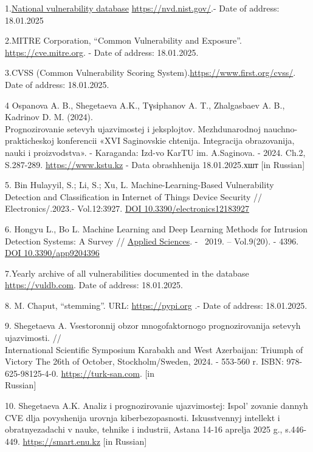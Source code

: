\begin{references}
1.\href{https://nvd.nist.gov/}{National
vulnerability database} \url{https://nvd.nist.gov/}.- Date of address:
18.01.2025

2.MITRE Corporation, ``Common Vulnerability and
Exposure''. \url{https://cve.mitre.org}. - Date of address:
18.01.2025. 

3.CVSS (Common Vulnerability Scoring
System).\url{https://www.first.org/cvss/}. Date of address:
18.01.2025. 

4 Ospanova A. B., Shegetaeva A.K., Tүsіphanov A. T., Zhalgasbaev A. B.,
Kadrinov D. M. (2024). \\Prognozirovanie setevyh ujazvimostej i
jeksplojtov. Mezhdunarodnoj nauchno-prakticheskoj konferencii «XVI
Saginovskie chtenija. Integracija obrazovanija, nauki i proizvodstva». -
Karaganda: Izd-vo KarTU im. A.Saginova. - 2024. Ch.2, S.287-289.
\href{https://www.kstu.kz/wp-content/uploads/2024/07/2-chast.pdf}{https://www.kstu.kz}
- Data obrashhenija 18.01.2025.хшт {[}in Russian{]}

5. Bin Hulayyil, S.; Li, S.; Xu, L. Machine-Learning-Based Vulnerability
Detection and Classification in Internet of Things Device Security //
Electronics/.2023.- Vol.12:3927.
\href{https://doi.org/10.3390/electronics12183927}{DOI
10.3390/electronics12183927}

6. Hongyu L., Bo L. Machine Learning and Deep Learning Methods for
Intrusion Detection Systems: A Survey //
\href{https://www.mdpi.com/journal/applsci}{Applied Sciences}. - ~2019.
-- Vol.9(20). - 4396. \href{https://doi.org/10.3390/app9204396}{DOI
10.3390/app9204396}

7.Yearly archive of all vulnerabilities
documented in the database \href{https://vuldb.com/?archive}{https://vuldb.com}. Date of
address: 18.01.2025. 

8. M. Chaput, ``stemming''. URL: \href{https://pypi.org/project/0.618/}{https://pypi.org} .-
Date of address: 18.01.2025.

9. Shegetaeva A. Vsestoronnij obzor mnogofaktornogo prognozirovanija
setevyh ujazvimosti. // \\International Scientific Symposium Karabakh and
West Azerbaijan:
Triumph of Victory The 26th of October, Stockholm/Sweden, 2024. -
553-560 r. ISBN: 978-625-98125-4-0.
\href{https://turk-san.com/konfranslar/231-nternational-scientific-symposium-karabakh-and-west-azerbaijan-triumph-of-victory-the-26th-of-october-2024-stockholm-sweden.html}{https://turk-san.com}. {[}in \\Russian{]}

10. Shegetaeva A.K. Analiz i prognozirovanie ujazvimostej:
Ispol' zovanie dannyh CVE dlja povyshenija urovnja
kiberbezopasnosti. Iskusstvennyj intellekt i obratnyezadachi v nauke,
tehnike i industrii, Astana 14-16 aprelja 2025 g., s.446-449.
\href{https://smart.enu.kz/api/serve?path=/general/files/dd26ee00-0bdb-4b8e-882a-b9b9e6a6fac3.pdf}{https://smart.enu.kz}
{[}in Russian{]}
\end{references}

